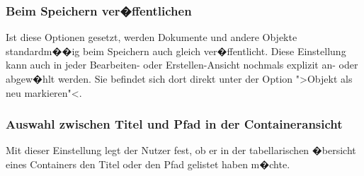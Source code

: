 \subsubsection{Beim Speichern ver�ffentlichen}
Ist diese Optionen gesetzt, werden Dokumente und andere Objekte standardm��ig beim Speichern auch gleich ver�ffentlicht. Diese Einstellung kann auch in jeder Bearbeiten- oder Erstellen-Ansicht nochmals explizit an- oder abgew�hlt werden. Sie befindet sich dort direkt unter der Option ">Objekt als neu markieren"<.

\subsubsection{Auswahl zwischen Titel und Pfad in der Containeransicht}
Mit dieser Einstellung legt der Nutzer fest, ob er in der tabellarischen �bersicht eines Containers den Titel oder den Pfad gelistet haben m�chte.